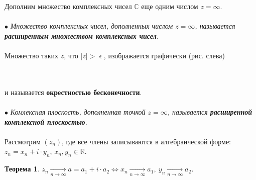 \documentclass[a4paper, 12pt]{article}
\newcommand{\Rm}{\mathbb{R}}
\newcommand{\Cm}{\mathbb{C}}
\renewcommand{\epsilon}{\upvarepsilon}
\newtheorem*{theorem}{Теорема}
\begin{document}
\hfill
\parbox[b][4.5cm][t]{110mm}{Дополним множество комплексных чисел $\Cm$ еще одним числом $z = \infty$.\\\\
	$\bullet$ \textit{Множество комплексных чисел, дополненных числом $z = \infty$, называется \textbf{расширенным множеством комплексных чисел}.}\\\\
	Множество таких $z$, что $|z|>\epsilon$, изображается графически (рис. слева)}\\\\
и называется \textbf{окрестностью бесконечности}.\\\\
$\bullet$ \textit{Комлексная плоскость, дополненная точкой $z = \infty$, называется \textbf{расширенной комплексной плоскостью}.}\\\\
Рассмотрим $(z_n)$, где все члены записываются в алгебраической форме: $z_n = x_n + i\cdot y_n$, $x_n,y_n \in \Rm$.
\begin{theorem}
	$z_n \underset{n\to\infty}{\longrightarrow} a = a_1 + i\cdot a_2 \Longleftrightarrow x_n \underset{n\to\infty}{\longrightarrow} a_1,\ y_n \underset{n\to\infty}{\longrightarrow}a_2$.
\end{theorem}
\end{document}
